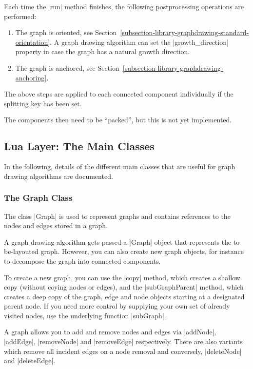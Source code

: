 Each time the |run| method finishes, the following postprocessing
operations are performed:
\begin{enumerate}
\item The graph is oriented, see
  Section~\ref{subsection-library-graphdrawing-standard-orientation}. A
  graph drawing algorithm can set the |growth_direction| property in
  case the graph has a natural growth direction.
\item The graph is anchored, see
  Section~\ref{subsection-library-graphdrawing-anchoring}. 
\end{enumerate}
The above steps are applied to each connected component individually
if the splitting key has been set.

The components then need to be ``packed'', but this is not yet
implemented.




\subsection{Lua Layer: The Main Classes}

In the following, details of the different main classes that are
useful for graph drawing algorithms are documented.


\subsubsection{The Graph Class}

The class |Graph| is used to represent graphs and contains
references to the nodes and edges stored in a graph.

A graph drawing algorithm gets passed a |Graph| object that represents
the to-be-layouted graph. However, you can also create new graph
objects, for instance to decompose the graph into connected
components. 

To create a new graph, you can use the |copy| method, which creates a 
shallow copy (without coying nodes or edges), and the
|subGraphParent| method, which creates a deep copy of the graph, edge
and node objects starting at a designated parent node. If you need
more control by supplying your own set of already visited nodes, use
the underlying function |subGraph|.

A graph allows you to add and remove nodes and edges via |addNode|,
|addEdge|, |removeNode| and |removeEdge| respectively.  There are also
variants which remove all incident edges on a node removal and
conversely, |deleteNode| and |deleteEdge|.

